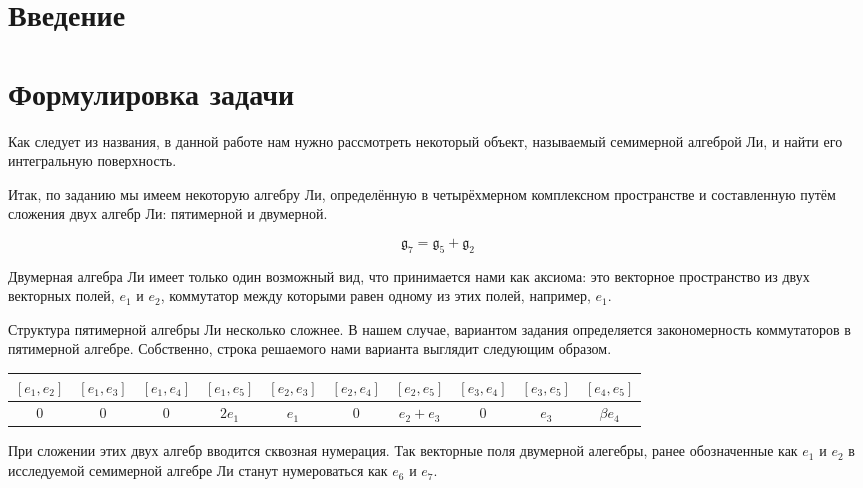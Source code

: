 \documentclass{article}
\begin{document}
\section{Введение}
\newpage
\section{Формулировка задачи}

Как следует из названия, в данной работе нам нужно рассмотреть некоторый объект, называемый семимерной алгеброй Ли, и найти его интегральную поверхность.

Итак, по заданию мы имеем некоторую алгебру Ли, определённую в четырёхмерном комплексном пространстве и составленную путём сложения двух алгебр Ли: пятимерной и двумерной.

\begin{equation}
\mathfrak{g}_{7} = \mathfrak{g}_{5} + \mathfrak{g}_{2}
\end{equation}

Двумерная алгебра Ли имеет только один возможный вид, что принимается нами как аксиома: это векторное пространство из двух векторных полей, $e_{1}$ и $e_{2}$, коммутатор между которыми равен одному из этих полей, например, $e_{1}$.

Структура пятимерной алгебры Ли несколько сложнее. В нашем случае, вариантом задания определяется закономерность коммутаторов в пятимерной алгебре. Собственно, строка решаемого нами варианта выглядит следующим образом.

\begin{table}[h]
\begin{center}
\begin{tabular}{|c|c|c|c|c|c|c|c|c|c|}
\hline
$[e_{1},e_{2}]$ & $[e_{1},e_{3}]$ & $[e_{1},e_{4}]$ & \cellcolor{honey} $[e_{1},e_{5}]$ & \cellcolor{honey} $[e_{2},e_{3}]$ & $[e_{2},e_{4}]$ & \cellcolor{honey} $[e_{2},e_{5}]$ & $[e_{3},e_{4}]$ & \cellcolor{honey} $[e_{3},e_{5}]$ & \cellcolor{honey} $[e_{4},e_{5}]$ \\
\hline
 $0$ & $0$ & $0$ & $2e_{1}$ &  $e_{1}$ & $0$ & $e_{2}+e_{3}$ & $0$ & $e_{3}$ &  $\beta e_{4}$ \\
\hline
\end{tabular}
\end{center}
\end{table}

При сложении этих двух алгебр вводится сквозная нумерация. Так векторные поля двумерной алегебры, ранее обозначенные как $e_{1}$ и $e_{2}$ в исследуемой семимерной алгебре Ли станут нумероваться как $e_{6}$ и $e_{7}$.
\end{document}
